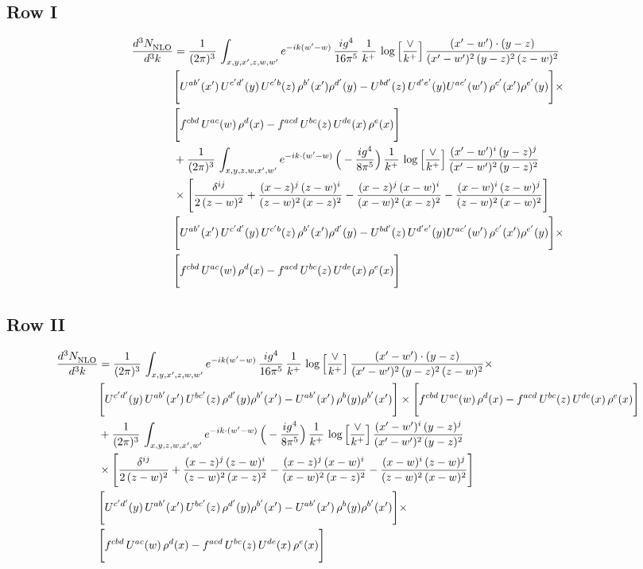 \documentclass[9pt]{article}
\numberwithin{equation}{section}
\begin{document}
\subsection{Row I}
\begin{align}
     \frac{d^{3}N_{\rm NLO}^{\rm}}{d^{3}k}  & =  \frac{1}{(2\pi)^{3}}\, \int_{x,y,x',z,w,w^{\prime}} e^{-ik(w^{\prime}-w)}\, \frac{ig^{4}}{16\pi^{5}}\,\frac{1}{k^{+}}\,\log{\left[\frac{\vee}{k^{+}}\right]}\, \frac{(x'-w')\cdot (y-z)}{(x'-w')^{2}\,(y-z)^{2}\,(z-w)^{2}}\notag \\ &  \Bigg[U^{ab'}(x')\,U^{c'd'}(y)\,U^{c'b}(z)\,\rho^{b'}(x')\rho^{d'}(y)-U^{bd'}(z)\,U^{d'e'}(y)U^{ac'}(w')\,\rho^{c'}(x')\rho^{e'}(y)\Bigg]\times\notag \\ & \Bigg[f^{cbd}\,U^{ac}(w)\,\rho^{d}(x)-f^{acd}\, U^{bc}(z)\,U^{de}(x)\,\rho^{e}(x)\Bigg] 
\notag \\ & +\frac{1}{(2\pi)^{3}}\,\int_{x,y,z,w,x',w'}e^{-ik\cdot (w^\prime-w)}\,\Big(-\frac{ig^{4}}{8\pi^{5}}\Big)\,\frac{1}{k^{+}}\,\log{\left[\frac{\vee}{k^{+}}\right]}\,\frac{(x'-w')^{i}\,(y-z)^{j}}{(x'-w')^{2}\,(y-z)^{2}}\notag \\ & \times \Bigg[\frac{\delta^{ij}}{2\,(z-w)^{2}}+\frac{(x-z)^{j}\,(z-w)^{i}}{(z-w)^{2}\,(x-z)^{2}}-\frac{(x-z)^{j}\,(x-w)^{i}}{(x-w)^{2}\,(x-z)^{2}}-\frac{(x-w)^{i}\,(z-w)^{j}}{(z-w)^{2}\,(x-w)^{2}}\Bigg]\notag \\ & \Bigg[U^{ab'}(x')\,U^{c'd'}(y)\,U^{c'b}(z)\,\rho^{b'}(x')\rho^{d'}(y)-U^{bd'}(z)\,U^{d'e'}(y)U^{ac'}(w')\,\rho^{c'}(x')\rho^{e'}(y)\Bigg]\times\notag \\ & \Bigg[f^{cbd}\,U^{ac}(w)\,\rho^{d}(x)-f^{acd}\, U^{bc}(z)\,U^{de}(x)\,\rho^{e}(x)\Bigg]
\end{align}
\subsection{Row II}
\begin{align}
     \frac{d^{3}N_{\rm NLO}^{\rm}}{d^{3}k}  & =  \frac{1}{(2\pi)^{3}}\, \int_{x,y,x',z,w,w^{\prime}} e^{-ik(w^{\prime}-w)}\, \frac{ig^{4}}{16\pi^{5}}\,\frac{1}{k^{+}}\,\log{\left[\frac{\vee}{k^{+}}\right]}\, \frac{(x'-w')\cdot (y-z)}{(x'-w')^{2}\,(y-z)^{2}\,(z-w)^{2}}\times\,\notag \\ & \Bigg[U^{c'd'}(y)\,U^{ab'}(x')\,U^{bc'}(z)\,\rho^{d'}(y)\rho^{b'}(x')-U^{ab'}(x')\,\rho^{b}(y)\rho^{b'}(x')\Bigg]\times \Bigg[f^{cbd}\,U^{ac}(w)\,\rho^{d}(x)-f^{acd}\, U^{bc}(z)\,U^{de}(x)\,\rho^{e}(x)\Bigg]
\notag \\ & +\frac{1}{(2\pi)^{3}}\,\int_{x,y,z,w,x',w'}e^{-ik\cdot (w^\prime-w)}\,\Big(-\frac{ig^{4}}{8\pi^{5}}\Big)\,\frac{1}{k^{+}}\,\log{\left[\frac{\vee}{k^{+}}\right]}\,\frac{(x'-w')^{i}\,(y-z)^{j}}{(x'-w')^{2}\,(y-z)^{2}}\notag \\ & \times \Bigg[\frac{\delta^{ij}}{2\,(z-w)^{2}}+\frac{(x-z)^{j}\,(z-w)^{i}}{(z-w)^{2}\,(x-z)^{2}}-\frac{(x-z)^{j}\,(x-w)^{i}}{(x-w)^{2}\,(x-z)^{2}}-\frac{(x-w)^{i}\,(z-w)^{j}}{(z-w)^{2}\,(x-w)^{2}}\Bigg]\notag \\ & \Bigg[U^{c'd'}(y)\,U^{ab'}(x')\,U^{bc'}(z)\,\rho^{d'}(y)\rho^{b'}(x')-U^{ab'}(x')\,\rho^{b}(y)\rho^{b'}(x')\Bigg]\times\notag \\ & \Bigg[f^{cbd}\,U^{ac}(w)\,\rho^{d}(x)-f^{acd}\, U^{bc}(z)\,U^{de}(x)\,\rho^{e}(x)\Bigg]
\end{align}
\end{document}
